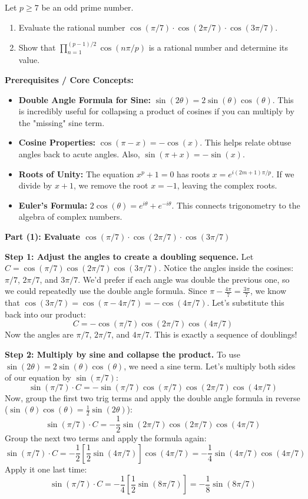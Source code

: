 \begin{exercise}
\label{algebra:2010:9}
Let $p \geq 7$ be an odd prime number.
\begin{enumerate}
    \item Evaluate the rational number $\cos(\pi/7) \cdot \cos(2\pi/7) \cdot \cos(3\pi/7)$.
    \item Show that $\prod_{n=1}^{(p-1)/2} \cos(n\pi/p)$ is a rational number and determine its value.
\end{enumerate}
\end{exercise}

\begin{solution}
\textbf{Prerequisites / Core Concepts:}
\begin{itemize}
    \item \textbf{Double Angle Formula for Sine:} $\sin(2\theta) = 2 \sin(\theta)\cos(\theta)$. This is incredibly useful for collapsing a product of cosines if you can multiply by the "missing" sine term.
    \item \textbf{Cosine Properties:} $\cos(\pi - x) = -\cos(x)$. This helps relate obtuse angles back to acute angles. Also, $\sin(\pi + x) = -\sin(x)$.
    \item \textbf{Roots of Unity:} The equation $x^p + 1 = 0$ has roots $x = e^{i(2m+1)\pi/p}$. If we divide by $x+1$, we remove the root $x=-1$, leaving the complex roots.
    \item \textbf{Euler's Formula:} $2 \cos(\theta) = e^{i\theta} + e^{-i\theta}$. This connects trigonometry to the algebra of complex numbers.
\end{itemize}

\textbf{Part (1): Evaluate $\cos(\pi/7) \cdot \cos(2\pi/7) \cdot \cos(3\pi/7)$}

\textbf{Step 1: Adjust the angles to create a doubling sequence.}
Let $C = \cos(\pi/7) \cos(2\pi/7) \cos(3\pi/7)$.
Notice the angles inside the cosines: $\pi/7$, $2\pi/7$, and $3\pi/7$. We'd prefer if each angle was double the previous one, so we could repeatedly use the double angle formula.
Since $\pi - \frac{4\pi}{7} = \frac{3\pi}{7}$, we know that $\cos(3\pi/7) = \cos(\pi - 4\pi/7) = -\cos(4\pi/7)$.
Let's substitute this back into our product:
\[ C = -\cos(\pi/7) \cos(2\pi/7) \cos(4\pi/7) \]
Now the angles are $\pi/7$, $2\pi/7$, and $4\pi/7$. This is exactly a sequence of doublings!

\textbf{Step 2: Multiply by sine and collapse the product.}
To use $\sin(2\theta) = 2 \sin(\theta)\cos(\theta)$, we need a sine term. Let's multiply both sides of our equation by $\sin(\pi/7)$:
\[ \sin(\pi/7) \cdot C = -\sin(\pi/7) \cos(\pi/7) \cos(2\pi/7) \cos(4\pi/7) \]
Now, group the first two trig terms and apply the double angle formula in reverse ($\sin(\theta)\cos(\theta) = \frac{1}{2}\sin(2\theta)$):
\[ \sin(\pi/7) \cdot C = -\frac{1}{2} \sin(2\pi/7) \cos(2\pi/7) \cos(4\pi/7) \]
Group the next two terms and apply the formula again:
\[ \sin(\pi/7) \cdot C = -\frac{1}{2} \left[ \frac{1}{2} \sin(4\pi/7) \right] \cos(4\pi/7) = -\frac{1}{4} \sin(4\pi/7) \cos(4\pi/7) \]
Apply it one last time:
\[ \sin(\pi/7) \cdot C = -\frac{1}{4} \left[ \frac{1}{2} \sin(8\pi/7) \right] = -\frac{1}{8} \sin(8\pi/7) \]


\end{solution}
